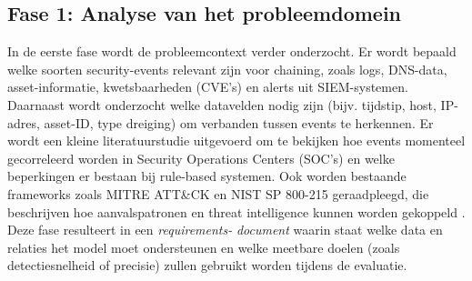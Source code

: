 \subsection{Fase 1: Analyse van het probleemdomein}
In de eerste fase wordt de probleemcontext verder onderzocht.  
Er wordt bepaald welke soorten security-events relevant zijn voor chaining, zoals logs, DNS-data, asset-informatie, kwetsbaarheden (CVE’s) en alerts uit SIEM-systemen.  
Daarnaast wordt onderzocht welke datavelden nodig zijn (bijv. tijdstip, host, IP-adres, asset-ID, type dreiging) om verbanden tussen events te herkennen.  
\newline
\newline
Er wordt een kleine literatuurstudie uitgevoerd om te bekijken hoe events momenteel gecorreleerd worden in Security Operations Centers (SOC’s) en welke beperkingen er bestaan bij rule-based systemen.  
Ook worden bestaande frameworks zoals MITRE ATT\&CK en NIST SP 800-215 geraadpleegd, die beschrijven hoe aanvalspatronen en threat intelligence kunnen worden gekoppeld \newline \autocite{MITRE2024, NIST2023}.  
\newline
\newline
Deze fase resulteert in een \emph{requirements-} \newline \emph{document} waarin staat welke data en relaties het model moet ondersteunen en welke meetbare doelen (zoals detectiesnelheid of precisie) zullen gebruikt worden tijdens de evaluatie.


